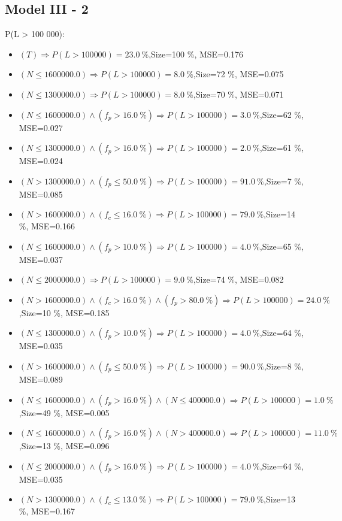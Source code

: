 \documentclass[numbered]{CSL}
\begin{document}
\subsection{Model III - 2}
P(L > 100 000):
\begin{itemize}
\item $(T) \Rightarrow P(L > 100 000) = 23.0~\%$,\hfill Size=100 \%, MSE=0.176
\item $(N \leq 1600000.0) \Rightarrow P(L > 100 000) = 8.0~\%$,\hfill Size=72 \%, MSE=0.075
\item $(N \leq 1300000.0) \Rightarrow P(L > 100 000) = 8.0~\%$,\hfill Size=70 \%, MSE=0.071
\item $(N \leq 1600000.0) \land (f_p > 16.0~\%) \Rightarrow P(L > 100 000) = 3.0~\%$,\hfill Size=62 \%, MSE=0.027
\item $(N \leq 1300000.0) \land (f_p > 16.0~\%) \Rightarrow P(L > 100 000) = 2.0~\%$,\hfill Size=61 \%, MSE=0.024
\item $(N > 1300000.0) \land (f_p \leq 50.0~\%) \Rightarrow P(L > 100 000) = 91.0~\%$,\hfill Size=7 \%, MSE=0.085
\item $(N > 1600000.0) \land (f_c \leq 16.0~\%) \Rightarrow P(L > 100 000) = 79.0~\%$,\hfill Size=14 \%, MSE=0.166
\item $(N \leq 1600000.0) \land (f_p > 10.0~\%) \Rightarrow P(L > 100 000) = 4.0~\%$,\hfill Size=65 \%, MSE=0.037
\item $(N \leq 2000000.0) \Rightarrow P(L > 100 000) = 9.0~\%$,\hfill Size=74 \%, MSE=0.082
\item $(N > 1600000.0) \land (f_c > 16.0~\%) \land (f_p > 80.0~\%) \Rightarrow P(L > 100 000) = 24.0~\%$,\hfill Size=10 \%, MSE=0.185
\item $(N \leq 1300000.0) \land (f_p > 10.0~\%) \Rightarrow P(L > 100 000) = 4.0~\%$,\hfill Size=64 \%, MSE=0.035
\item $(N > 1600000.0) \land (f_p \leq 50.0~\%) \Rightarrow P(L > 100 000) = 90.0~\%$,\hfill Size=8 \%, MSE=0.089
\item $(N \leq 1600000.0) \land (f_p > 16.0~\%) \land (N \leq 400000.0) \Rightarrow P(L > 100 000) = 1.0~\%$,\hfill Size=49 \%, MSE=0.005
\item $(N \leq 1600000.0) \land (f_p > 16.0~\%) \land (N > 400000.0) \Rightarrow P(L > 100 000) = 11.0~\%$,\hfill Size=13 \%, MSE=0.096
\item $(N \leq 2000000.0) \land (f_p > 16.0~\%) \Rightarrow P(L > 100 000) = 4.0~\%$,\hfill Size=64 \%, MSE=0.035
\item $(N > 1300000.0) \land (f_c \leq 13.0~\%) \Rightarrow P(L > 100 000) = 79.0~\%$,\hfill Size=13 \%, MSE=0.167

\end{itemize}
\end{document}
